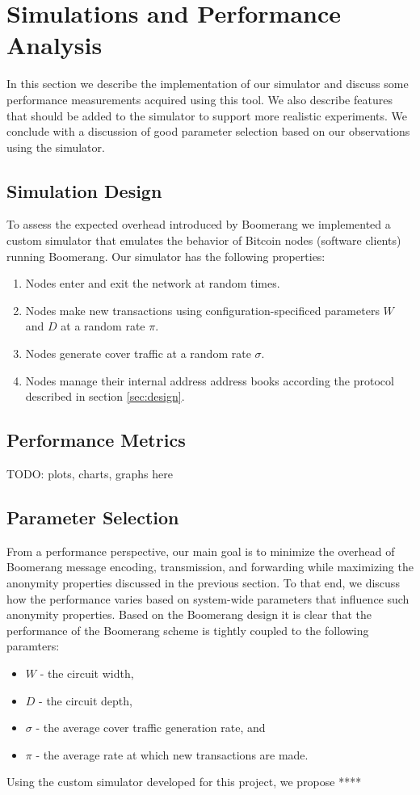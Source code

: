 \section{Simulations and Performance Analysis}
In this section we describe the implementation of our simulator and discuss some performance measurements acquired using this tool. We also describe features that should be added to the simulator to support more realistic experiments. We conclude with a discussion of good parameter selection based on our observations using the simulator.

\subsection{Simulation Design}
To assess the expected overhead introduced by Boomerang we implemented a custom simulator that emulates the behavior of Bitcoin nodes (software clients) running Boomerang. Our simulator has the following properties:
\begin{enumerate}
	\item Nodes enter and exit the network at random times. 
	\item Nodes make new transactions using configuration-specificed parameters $W$ and $D$ at a random rate $\pi$.
	\item Nodes generate cover traffic at a random rate $\sigma$.
	\item Nodes manage their internal address address books according the protocol described in section \ref{sec:design}.
\end{enumerate}


\subsection{Performance Metrics}
TODO: plots, charts, graphs here

\subsection{Parameter Selection}

From a performance perspective, our main goal is to minimize the overhead of Boomerang message encoding, transmission, and forwarding while maximizing the anonymity properties discussed in the previous section. To that end, we discuss how the performance varies based on system-wide parameters that influence such anonymity properties. Based on the Boomerang design it is clear that the performance of the Boomerang scheme is tightly coupled to the following paramters:
\begin{itemize}
	\item $W$ - the circuit width,
	\item $D$ - the circuit depth,
	\item $\sigma$ - the average cover traffic generation rate, and
	\item $\pi$ - the average rate at which new transactions are made.
\end{itemize}

Using the custom simulator developed for this project, we propose ****



